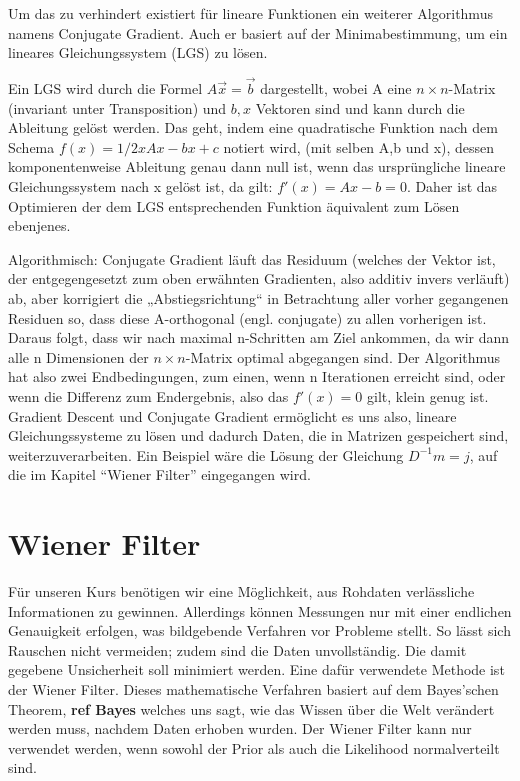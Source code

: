 \documentclass[]{dsadokumentation}
\newcommand\comment[1]{{\color{red} \textbf{#1}}}
\begin{document}
Um das zu verhindert existiert für lineare Funktionen ein weiterer Algorithmus namens Conjugate Gradient. Auch er basiert auf der Minimabestimmung, um ein lineares Gleichungssystem (LGS) zu lösen.

Ein LGS wird durch die Formel $A\vec{x} = \vec{b}$ dargestellt, wobei A eine $ n \times n $-Matrix (invariant unter Transposition) und $ b,x $ Vektoren sind und kann durch die Ableitung gelöst werden. Das geht, indem eine quadratische Funktion nach dem Schema $ f(x) = 1/2xAx-bx+c $ notiert wird, (mit selben A,b und x), dessen komponentenweise Ableitung genau dann null ist, wenn das ursprüngliche lineare Gleichungssystem nach x gelöst ist, da gilt: $f'(x) = Ax-b = 0$. Daher ist das Optimieren der dem LGS entsprechenden Funktion äquivalent zum Lösen ebenjenes.

Algorithmisch: Conjugate Gradient läuft das Residuum (welches der Vektor ist, der entgegengesetzt zum oben erwähnten Gradienten, also additiv invers verläuft) ab, aber korrigiert die „Abstiegsrichtung“ in Betrachtung aller vorher gegangenen Residuen so, dass diese A-orthogonal (engl. conjugate) zu allen vorherigen ist. Daraus folgt, dass wir nach maximal n-Schritten am Ziel ankommen, da wir dann alle n Dimensionen der $ n \times n $-Matrix optimal abgegangen sind. Der Algorithmus hat also zwei Endbedingungen, zum einen, wenn n Iterationen erreicht sind, oder wenn die Differenz zum Endergebnis, also das $ f'(x) = 0 $ gilt, klein genug ist.
Gradient Descent und Conjugate Gradient ermöglicht es uns also, lineare Gleichungssysteme zu lösen und dadurch Daten, die in Matrizen gespeichert sind, weiterzuverarbeiten. Ein Beispiel wäre die Lösung der Gleichung  $ D^{-1} m = j $, auf die im Kapitel \enquote{Wiener Filter} eingegangen wird.

\section{Wiener Filter}
Für unseren Kurs benötigen wir eine Möglichkeit, aus Rohdaten verlässliche Informationen zu gewinnen.
Allerdings können Messungen nur mit einer endlichen Genauigkeit erfolgen, was bildgebende Verfahren vor Probleme stellt.
So lässt sich Rauschen nicht vermeiden; zudem sind die Daten unvollständig.
Die damit gegebene Unsicherheit soll minimiert werden.
Eine dafür verwendete Methode ist der Wiener Filter.
Dieses mathematische Verfahren basiert auf dem Bayes'schen Theorem, \comment{ref Bayes} welches uns sagt, wie das Wissen über die Welt verändert werden muss, nachdem Daten erhoben wurden.
Der Wiener Filter kann nur verwendet werden, wenn sowohl der Prior als auch die Likelihood normalverteilt sind.
\end{document}
